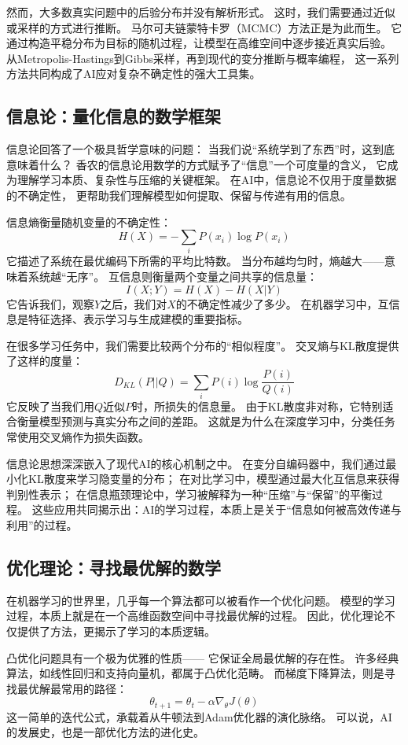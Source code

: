 然而，大多数真实问题中的后验分布并没有解析形式。  
这时，我们需要通过近似或采样的方式进行推断。  
马尔可夫链蒙特卡罗（MCMC）方法正是为此而生。  
它通过构造平稳分布为目标的随机过程，让模型在高维空间中逐步接近真实后验。  
从Metropolis-Hastings到Gibbs采样，再到现代的变分推断与概率编程，  
这一系列方法共同构成了AI应对复杂不确定性的强大工具集。

\subsection{信息论：量化信息的数学框架}

信息论回答了一个极具哲学意味的问题：  
当我们说“系统学到了东西”时，这到底意味着什么？  
香农的信息论用数学的方式赋予了“信息”一个可度量的含义，  
它成为理解学习本质、复杂性与压缩的关键框架。  
在AI中，信息论不仅用于度量数据的不确定性，  
更帮助我们理解模型如何提取、保留与传递有用的信息。

信息熵衡量随机变量的不确定性：
$$H(X) = -\sum_{i} P(x_i) \log P(x_i)$$
它描述了系统在最优编码下所需的平均比特数。  
当分布越均匀时，熵越大——意味着系统越“无序”。  
互信息则衡量两个变量之间共享的信息量：
$$I(X;Y) = H(X) - H(X|Y)$$
它告诉我们，观察$Y$之后，我们对$X$的不确定性减少了多少。  
在机器学习中，互信息是特征选择、表示学习与生成建模的重要指标。

在很多学习任务中，我们需要比较两个分布的“相似程度”。  
交叉熵与KL散度提供了这样的度量：
$$D_{KL}(P||Q) = \sum_i P(i)\log\frac{P(i)}{Q(i)}$$
它反映了当我们用$Q$近似$P$时，所损失的信息量。  
由于KL散度非对称，它特别适合衡量模型预测与真实分布之间的差距。  
这就是为什么在深度学习中，分类任务常使用交叉熵作为损失函数。

信息论思想深深嵌入了现代AI的核心机制之中。  
在变分自编码器中，我们通过最小化KL散度来学习隐变量的分布；  
在对比学习中，模型通过最大化互信息来获得判别性表示；  
在信息瓶颈理论中，学习被解释为一种“压缩”与“保留”的平衡过程。  
这些应用共同揭示出：AI的学习过程，本质上是关于“信息如何被高效传递与利用”的过程。

\subsection{优化理论：寻找最优解的数学}

在机器学习的世界里，几乎每一个算法都可以被看作一个优化问题。  
模型的学习过程，本质上就是在一个高维函数空间中寻找最优解的过程。  
因此，优化理论不仅提供了方法，更揭示了学习的本质逻辑。

凸优化问题具有一个极为优雅的性质——  
它保证全局最优解的存在性。  
许多经典算法，如线性回归和支持向量机，都属于凸优化范畴。  
而梯度下降算法，则是寻找最优解最常用的路径：  
$$\theta_{t+1} = \theta_t - \alpha \nabla_\theta J(\theta)$$  
这一简单的迭代公式，承载着从牛顿法到Adam优化器的演化脉络。  
可以说，AI的发展史，也是一部优化方法的进化史。

